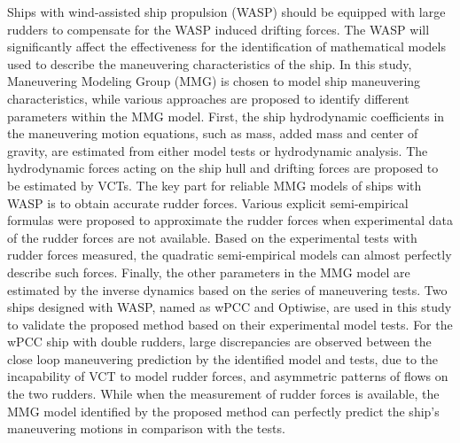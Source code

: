 Ships with wind-assisted ship propulsion (WASP) should be equipped with large rudders to compensate for the WASP induced drifting forces. The WASP will significantly affect the effectiveness for the identification of mathematical models used to describe the maneuvering characteristics of the ship. In this study, Maneuvering Modeling Group (MMG) is chosen to model ship maneuvering characteristics, while various approaches are proposed to identify different parameters within the MMG model. First, the ship hydrodynamic coefficients in the maneuvering motion equations, such as mass, added mass and center of gravity, are estimated from either model tests or hydrodynamic analysis. The hydrodynamic forces acting on the ship hull and drifting forces are proposed to be estimated by VCTs. The key part for reliable MMG models of ships with WASP is to obtain accurate rudder forces. Various explicit semi-empirical formulas were proposed to approximate the rudder forces when experimental data of the rudder forces are not available. Based on the experimental tests with rudder forces measured, the quadratic semi-empirical models can almost perfectly describe such forces. Finally, the other parameters in the MMG model are estimated by the inverse dynamics based on the series of maneuvering tests. Two ships designed with WASP, named as wPCC and Optiwise, are used in this study to validate the proposed method based on their experimental model tests. For the wPCC ship with double rudders, large discrepancies are observed between the close loop maneuvering prediction by the identified model and tests, due to the incapability of VCT to model rudder forces, and asymmetric patterns of flows on the two rudders. While when the measurement of rudder forces is available, the MMG model identified by the proposed method can perfectly predict the ship’s maneuvering motions in comparison with the tests.




